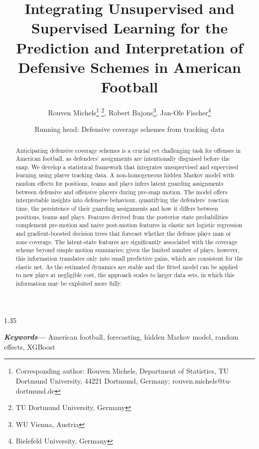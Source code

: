\documentclass[12pt,a4paper]{article}
\providecommand{\keywords}[1]
{
  \small	
  \textbf{\textit{Keywords---}} #1
}
\begin{document}
\begin{spacing}{1.35}

\title{Integrating Unsupervised and Supervised Learning for the Prediction and Interpretation of Defensive Schemes in American Football}
\author{Rouven Michels\thanks{Corresponding author: Rouven Michels, Department of Statistics, TU Dortmund University, 44221 Dortmund, Germany; rouven.michels@tu-dortmund.de} \thanks{TU Dortmund University, Germany}, Robert Bajons\thanks{WU Vienna, Austria}, Jan-Ole Fischer\thanks{Bielefeld University, Germany}}
\date{Running head: Defensive coverage schemes from tracking data}

\maketitle

\begin{abstract} 
\noindent
Anticipating defensive coverage schemes is a crucial yet challenging task for offenses in American football, as defenders’ assignments are intentionally disguised before the snap. We develop a statistical framework that integrates unsupervised and supervised learning using player tracking data. A non-homogeneous hidden Markov model with random effects for positions, teams and plays infers latent guarding assignments between defensive and offensive players during pre-snap motion. The model offers interpretable insights into defensive behaviour, quantifying the defenders' reaction time, the persistence of their guarding assignments and how it differs between positions, teams and plays. Features derived from the posterior state probabilities complement pre-motion and naive post-motion features in elastic net logistic regression and gradient-boosted decision trees that forecast whether the defense plays man or zone coverage. The latent-state features are significantly associated with the coverage scheme beyond simple motion summaries; given the limited number of plays, however, this information translates only into small predictive gains, which are consistent for the elastic net. As the estimated dynamics are stable and the fitted model can be applied to new plays at negligible cost, the approach scales to larger data sets, in which this information may be exploited more fully.
\end{abstract}
\keywords{American football, forecasting, hidden Markov model, random effects, XGBoost}


\end{spacing}
\end{document}
